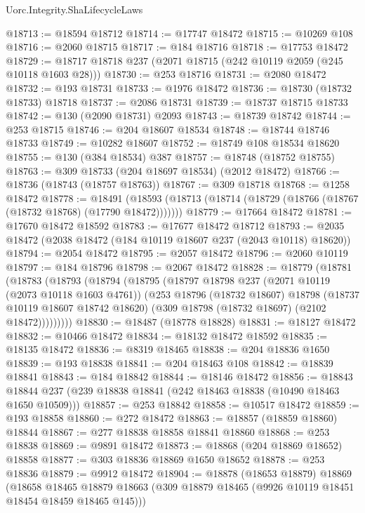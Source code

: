 \begin{lexlean}{Uorc.Integrity.ShaLifecycleLaws}
\begin{coremodule}
@18713 := @18594 @18712
@18714 := @17747 @18472
@18715 := @10269 @108
@18716 := @2060 @18715
@18717 := @184 @18716
@18718 := @17753 @18472
@18729 := @18717 @18718 @237 (@2071 @18715 (@242 @10119 @2059 (@245 @10118 @1603 @28)))
@18730 := @253 @18716
@18731 := @2080 @18472
@18732 := @193 @18731
@18733 := @1976 @18472
@18736 := @18730 (@18732 @18733) @18718
@18737 := @2086 @18731
@18739 := @18737 @18715 @18733
@18742 := @130 (@2090 @18731) @2093
@18743 := @18739 @18742
@18744 := @253 @18715
@18746 := @204 @18607 @18534
@18748 := @18744 @18746 @18733
@18749 := @10282 @18607
@18752 := @18749 @108 @18534 @18620
@18755 := @130 (@384 @18534) @387
@18757 := @18748 (@18752 @18755)
@18763 := @309 @18733 (@204 @18697 @18534) (@2012 @18472)
@18766 := @18736 (@18743 (@18757 @18763))
@18767 := @309 @18718
@18768 := @1258 @18472
@18778 := @18491
    (@18593 (@18713 (@18714 (@18729 (@18766 (@18767 (@18732 @18768) (@17790 @18472)))))))
@18779 := @17664 @18472
@18781 := @17670 @18472 @18592
@18783 := @17677 @18472 @18712
@18793 := @2035 @18472 (@2038 @18472 (@184 @10119 @18607 @237 (@2043 @10118) @18620))
@18794 := @2054 @18472
@18795 := @2057 @18472
@18796 := @2060 @10119
@18797 := @184 @18796
@18798 := @2067 @18472
@18828 := @18779
    (@18781
      (@18783
        (@18793
          (@18794
            (@18795
              (@18797
                @18798
                @237
                (@2071 @10119 (@2073 @10118 @1603 @4761))
                (@253
                  @18796
                  (@18732 @18607)
                  @18798
                  (@18737 @10119 @18607 @18742 @18620)
                  (@309 @18798 (@18732 @18697) (@2102 @18472)))))))))
@18830 := @18487 (@18778 @18828)
@18831 := @18127 @18472
@18832 := @10466 @18472
@18834 := @18132 @18472 @18592
@18835 := @18135 @18472
@18836 := @8319 @18465
@18838 := @204 @18836 @1650
@18839 := @193 @18838
@18841 := @204 @18463 @108
@18842 := @18839 @18841
@18843 := @184 @18842
@18844 := @18146 @18472
@18856 := @18843 @18844 @237 (@239 @18838 @18841 (@242 @18463 @18838 (@10490 @18463 @1650 @10509)))
@18857 := @253 @18842
@18858 := @10517 @18472
@18859 := @193 @18858
@18860 := @272 @18472
@18863 := @18857 (@18859 @18860) @18844
@18867 := @277 @18838 @18858 @18841 @18860
@18868 := @253 @18838
@18869 := @9891 @18472
@18873 := @18868 (@204 @18869 @18652) @18858
@18877 := @303 @18836 @18869 @1650 @18652
@18878 := @253 @18836
@18879 := @9912 @18472
@18904 := @18878
    (@18653 @18879)
    @18869
    (@18658
      @18465
      @18879
      @18663
      (@309 @18879 @18465 (@9926 @10119 @18451 @18454 @18459 @18465 @145)))

\end{coremodule}
\end{lexlean}
